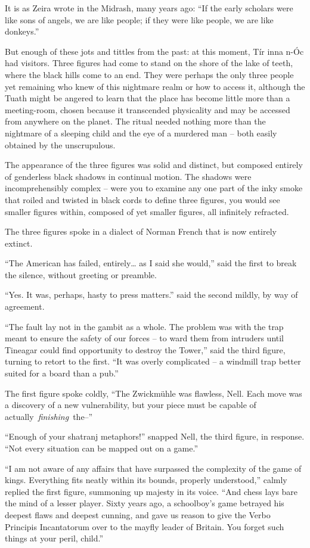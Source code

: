 It is as Zeira wrote in the Midrash, many years ago: ``If the early
scholars were like sons of angels, we are like people; if they were like
people, we are like donkeys.''

But enough of these jots and tittles from the past: at this moment, Tír
inna n-Óc had visitors. Three figures had come to stand on the shore of
the lake of teeth, where the black hills come to an end. They were
perhaps the only three people yet remaining who knew of this nightmare
realm or how to access it, although the Tuath might be angered to learn
that the place has become little more than a meeting-room, chosen
because it transcended physicality and may be accessed from anywhere on
the planet. The ritual needed nothing more than the nightmare of a
sleeping child and the eye of a murdered man -- both easily obtained by
the unscrupulous.

The appearance of the three figures was solid and distinct, but composed
entirely of genderless black shadows in continual motion. The shadows
were incomprehensibly complex -- were you to examine any one part of the
inky smoke that roiled and twisted in black cords to define three
figures, you would see smaller figures within, composed of yet smaller
figures, all infinitely refracted.

The three figures spoke in a dialect of Norman French that is now
entirely extinct.

``The American has failed, entirely\ldots{} as I said she would,'' said
the first to break the silence, without greeting or preamble.

``Yes. It was, perhaps, hasty to press matters.'' said the second
mildly, by way of agreement.

``The fault lay not in the gambit as a whole. The problem was with the
trap meant to ensure the safety of our forces -- to ward them from
intruders until Tineagar could find opportunity to destroy the Tower,''
said the third figure, turning to retort to the first. ``It was overly
complicated -- a windmill trap better suited for a board than a pub.''

The first figure spoke coldly, ``The Zwickmühle was flawless, Nell. Each
move was a discovery of a new vulnerability, but your piece must be
capable of actually~\emph{finishing}~the--''

``Enough of your shatranj metaphors!'' snapped Nell, the third figure,
in response. ``Not every situation can be mapped out on a game.''

``I am not aware of any affairs that have surpassed the complexity of
the game of kings. Everything fits neatly within its bounds, properly
understood,'' calmly replied the first figure, summoning up majesty in
its voice. ``And chess lays bare the mind of a lesser player. Sixty
years ago, a schoolboy's game betrayed his deepest flaws and deepest
cunning, and gave us reason to give the Verbo Principis Incantatorum
over to the mayfly leader of Britain. You forget such things at your
peril, child.''

